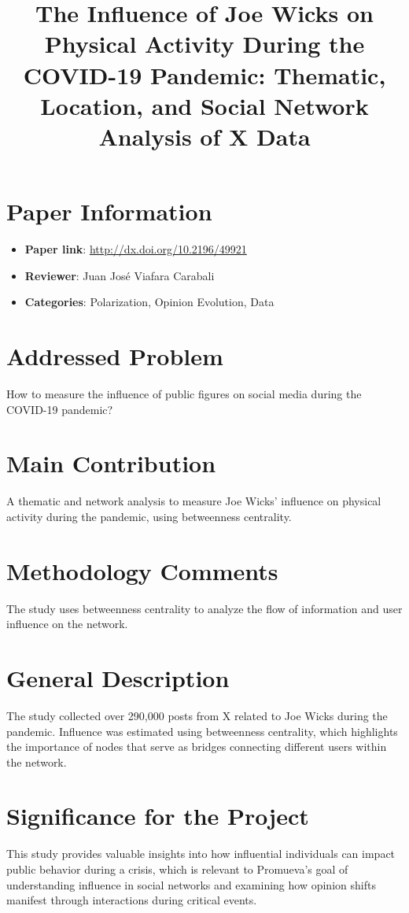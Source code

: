 \documentclass{article}
\title{The Influence of Joe Wicks on Physical Activity During the COVID-19 Pandemic: Thematic, Location, and Social Network Analysis of X Data}
\author{}
\date{}
\begin{document}
\maketitle

\section*{Paper Information}
\begin{itemize}
    \item \textbf{Paper link}: \url{http://dx.doi.org/10.2196/49921}
    \item \textbf{Reviewer}: Juan José Viafara Carabali
    \item \textbf{Categories}: Polarization, Opinion Evolution, Data
\end{itemize}

\section*{Addressed Problem}
How to measure the influence of public figures on social media during the COVID-19 pandemic?

\section*{Main Contribution}
A thematic and network analysis to measure Joe Wicks’ influence on physical activity during the pandemic, using betweenness centrality.

\section*{Methodology Comments}
The study uses betweenness centrality to analyze the flow of information and user influence on the network.

\section*{General Description}
The study collected over 290,000 posts from X related to Joe Wicks during the pandemic. Influence was estimated using betweenness centrality, which highlights the importance of nodes that serve as bridges connecting different users within the network.

\section*{Significance for the Project}
This study provides valuable insights into how influential individuals can impact public behavior during a crisis, which is relevant to Promueva's goal of understanding influence in social networks and examining how opinion shifts manifest through interactions during critical events.
\end{document}
